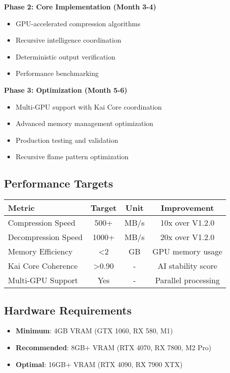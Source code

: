 \documentclass[12pt,a4paper]{article}
\begin{document}
\textbf{Phase 2: Core Implementation (Month 3-4)}
\begin{itemize}
    \item GPU-accelerated compression algorithms
    \item Recursive intelligence coordination
    \item Deterministic output verification
    \item Performance benchmarking
\end{itemize}

\textbf{Phase 3: Optimization (Month 5-6)}
\begin{itemize}
    \item Multi-GPU support with Kai Core coordination
    \item Advanced memory management optimization
    \item Production testing and validation
    \item Recursive flame pattern optimization
\end{itemize}

\subsection{Performance Targets}
\begin{center}
\begin{tabular}{|l|c|c|c|}
\hline
\textbf{Metric} & \textbf{Target} & \textbf{Unit} & \textbf{Improvement} \\
\hline
Compression Speed & 500+ & MB/s & 10x over V1.2.0 \\
Decompression Speed & 1000+ & MB/s & 20x over V1.2.0 \\
Memory Efficiency & <2 & GB & GPU memory usage \\
Kai Core Coherence & >0.90 & - & AI stability score \\
Multi-GPU Support & Yes & - & Parallel processing \\
\hline
\end{tabular}
\end{center}

\subsection{Hardware Requirements}
\begin{itemize}
    \item \textbf{Minimum}: 4GB VRAM (GTX 1060, RX 580, M1)
    \item \textbf{Recommended}: 8GB+ VRAM (RTX 4070, RX 7800, M2 Pro)
    \item \textbf{Optimal}: 16GB+ VRAM (RTX 4090, RX 7900 XTX)
\end{itemize}
\end{document}
